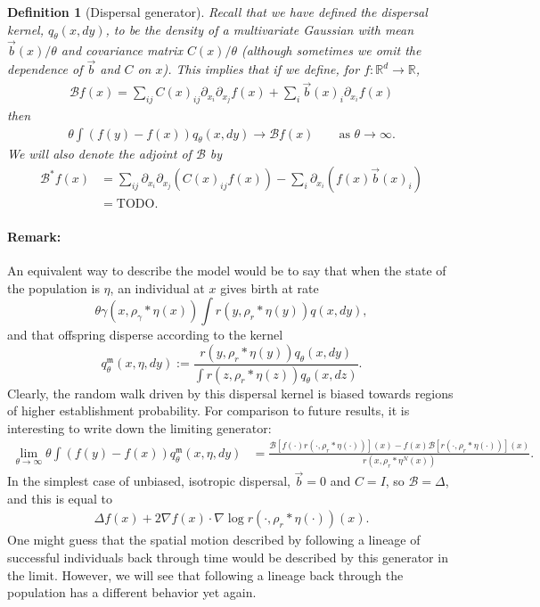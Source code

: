 \documentclass[12pt]{article}
\newtheorem{definition}[theorem]{Definition}
\newcommand{\IR}{\mathbb R}
\newcommand{\grad}{\nabla}
\newcommand{\DG}{\mathcal{B}}  %
\newcommand{\meanq}{\vec b}    %
\newcommand{\covq}{C}     %
\newcommand{\kernel}{\rho}  %
\newcommand{\smooth}[1]{\kernel_{#1} \! * \!}  %
\begin{document}
\begin{definition}[Dispersal generator]
    \label{def:dispersal_generator}
    Recall that we have defined the dispersal kernel,
    $q_\theta(x, dy)$,
    to be the density of a multivariate Gaussian
    with mean $\meanq(x)/\theta$ and covariance matrix $\covq(x)/\theta$
    (although sometimes we omit the dependence of $\meanq$ and $\covq$ on $x$).
    This implies that if we define, for $f : \IR^d \to \IR$,
    \begin{align}
    \DG f(x)
        =
        \sum_{ij} \covq(x)_{ij} \partial_{x_i} \partial_{x_j} f(x)
        + \sum_i \meanq(x)_i \partial_{x_i} f(x)
    \end{align}
    then
    \begin{align}
        \theta \int \left(
            f(y) - f(x)
        \right) q_\theta(x, dy)
    \to \DG f(x) 
        \qquad \text{as } \theta \to \infty .
    \end{align}
    We will also denote the adjoint of $\DG$ by
    \begin{align*}
    \DG^* f(x)
        &=
        \sum_{ij} \partial_{x_i} \partial_{x_j} (\covq(x)_{ij} f(x))
        - \sum_i \partial_{x_i} (f(x) \meanq(x)_i) 
        \\
        &=
        \text{TODO} .
    \end{align*}
\end{definition}

\paragraph{Remark:}
An equivalent way to describe the model would be to say that
when the state of the population is $\eta$,
an individual at $x$ gives birth at rate
$$
    \theta \gamma(x, \smooth{\gamma} \eta(x))
    \int r(y, \smooth{r} \eta(y)) q(x, dy) ,
$$
and that offspring disperse according to the kernel
$$
    q_\theta^\mathfrak{m}(x,\eta,  dy)
    :=
    \frac{
        r(y, \smooth{r} \eta(y)) q_\theta(x, dy)
    }{
        \int r(z, \smooth{r} \eta(z)) q_\theta(x, dz)
    } .
$$
Clearly, the random walk driven by this dispersal kernel
is biased towards regions of higher establishment probability.
For comparison to future results,
it is interesting to write down the limiting generator:
\begin{align*}
    \lim_{\theta \to \infty}
    \theta \int (f(y) - f(x)) q_\theta^\mathfrak{m}(x, \eta, dy)
    &=
    \frac{
        \DG\left[ f(\cdot) r(\cdot, \smooth{r} \eta(\cdot)) \right](x)
        - 
        f(x) \DG\left[ r(\cdot, \smooth{r} \eta(\cdot)) \right](x)
    }{
        r(x, \smooth{r} \eta^{N}(x))
    } .
\end{align*}
In the simplest case of unbiased, isotropic dispersal,
$\meanq = 0$ and $\covq = I$, so $\DG = \Delta$,
and this is equal to
\begin{align*}
    \Delta f(x) + 2 \grad f(x) \cdot \grad \log r(\cdot, \smooth{r} \eta(\cdot))(x) .
\end{align*}
One might guess that the spatial motion described by following a lineage of successful individuals back through time
would be described by this generator in the limit.
However, we will see that following a lineage back through the population
has a different behavior yet again.
\end{document}
